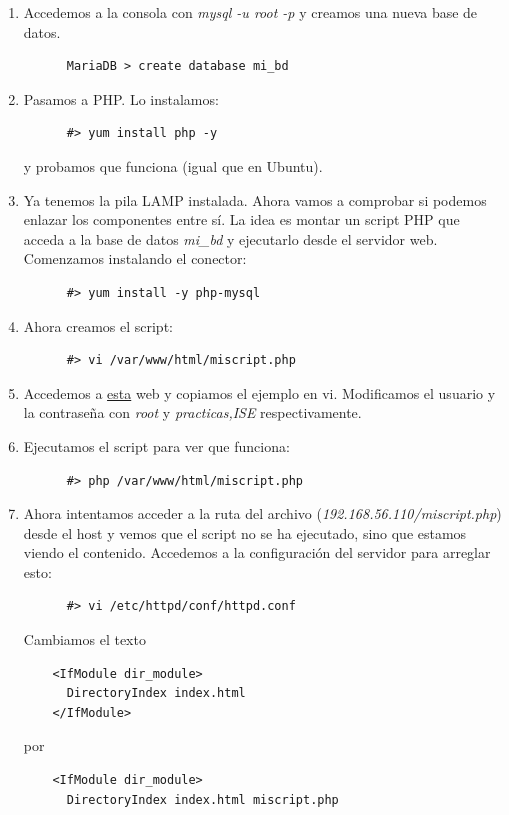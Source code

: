 \documentclass[12pt,spanish]{article}
\begin{document}
\begin{enumerate}
    \item Accedemos a la consola con \textit{mysql -u root -p} y creamos una nueva base de datos.
    \begin{lstlisting}
      MariaDB > create database mi_bd
    \end{lstlisting}
    \item Pasamos a PHP. Lo instalamos:
    \begin{lstlisting}
      #> yum install php -y
    \end{lstlisting}
    y probamos que funciona (igual que en Ubuntu).
    \item Ya tenemos la pila LAMP instalada. Ahora vamos a comprobar si podemos enlazar los componentes entre sí. La idea es montar un script PHP que acceda a la base de datos \textit{mi\_bd} y ejecutarlo desde el servidor web. Comenzamos instalando el conector:
    \begin{lstlisting}
      #> yum install -y php-mysql
    \end{lstlisting}
    \item Ahora creamos el script:
    \begin{lstlisting}
      #> vi /var/www/html/miscript.php
    \end{lstlisting}
    \item Accedemos a \href{https://www.php.net/manual/es/function.mysqli-connect.php}{esta} web y copiamos el ejemplo en vi. Modificamos el usuario y la contraseña con \textit{root} y \textit{practicas,ISE} respectivamente.
    \item Ejecutamos el script para ver que funciona:
    \begin{lstlisting}
      #> php /var/www/html/miscript.php
    \end{lstlisting}
    \item Ahora intentamos acceder a la ruta del archivo (\textit{192.168.56.110/miscript.php}) desde el host y vemos que el script no se ha ejecutado, sino que estamos viendo el contenido. Accedemos a la configuración del servidor para arreglar esto:
    \begin{lstlisting}
      #> vi /etc/httpd/conf/httpd.conf
    \end{lstlisting}
    Cambiamos el texto
    \begin{lstlisting}
    <IfModule dir_module>
      DirectoryIndex index.html
    </IfModule>
    \end{lstlisting}
    por
    \begin{lstlisting}
    <IfModule dir_module>
      DirectoryIndex index.html miscript.php

\end{lstlisting}
\end{enumerate}
\end{document}
